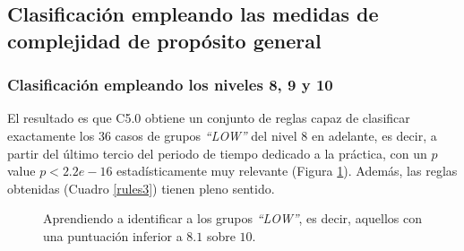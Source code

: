 \subsection{Clasificación empleando las medidas de complejidad de propósito general}

\subsubsection{Clasificación empleando los niveles 8, 9 y 10}

El resultado es que C5.0 obtiene un conjunto de reglas capaz de clasificar exactamente los $36$ casos de grupos \emph{``LOW''} del nivel $8$ en adelante, es decir, a partir del último tercio del periodo de tiempo dedicado a la práctica, con un $p$ value $p < 2.2e-16$ estadísticamente muy relevante (Figura \ref{fig:cm3}). Además, las reglas obtenidas (Cuadro \ref{rules3}) tienen pleno sentido.

\begin{figure}[H]
\centering
{}
\caption{Aprendiendo a identificar a los grupos \emph{``LOW''}, es decir, aquellos con una puntuación inferior a $8.1$ sobre $10$.}
\label{fig:cm3}
\end{figure}

